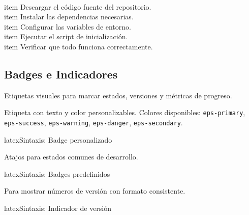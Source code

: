 \begin{enumerate}
  \\item Descargar el código fuente del repositorio.
  \\item Instalar las dependencias necesarias.
  \\item Configurar las variables de entorno.
  \\item Ejecutar el script de inicialización.
  \\item Verificar que todo funciona correctamente.
\end{enumerate}

\subsection{Badges e Indicadores}
\label{subsec:badges}

Etiquetas visuales para marcar estados, versiones y métricas de progreso.

Etiqueta con texto y color personalizables. Colores disponibles: \texttt{eps-primary},
\texttt{eps-success}, \texttt{eps-warning}, \texttt{eps-danger}, \texttt{eps-secondary}.

\begin{codigosimple}{latex}{Sintaxis: Badge personalizado}
\end{codigosimple}

\noindent
{} \quad
{} \quad
{} \quad
{} \quad
{}

Atajos para estados comunes de desarrollo.

\begin{codigosimple}{latex}{Sintaxis: Badges predefinidos}
\badgenew \badgewip \badgedeprecated
\badgebeta \badgerequired \badgeoptional
\end{codigosimple}

\noindent
\badgenew \quad \badgewip \quad \badgedeprecated \quad
\badgebeta \quad \badgerequired \quad \badgeoptional

Para mostrar números de versión con formato consistente.

\begin{codigosimple}{latex}{Sintaxis: Indicador de versión}
 
\end{codigosimple}

